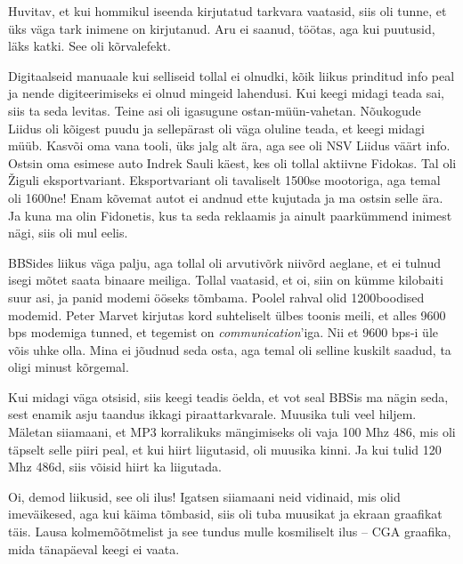 Huvitav, et kui hommikul iseenda kirjutatud 
tarkvara vaatasid, siis oli tunne, et üks väga tark inimene on kirjutanud. Aru ei 
saanud, töötas, aga kui puutusid, läks katki. See oli kõrvalefekt. 


Digitaalseid manuaale kui selliseid tollal ei olnudki, kõik liikus prinditud info peal 
ja nende digiteerimiseks ei olnud mingeid lahendusi. Kui keegi midagi teada sai, siis ta seda levitas. Teine asi oli igasugune 
ostan-müün-vahetan. Nõukogude Liidus oli kõigest puudu ja sellepärast oli väga oluline 
teada, et keegi midagi müüb. Kasvõi oma vana tooli, üks jalg 
alt ära, aga see oli NSV Liidus väärt info. Ostsin oma 
esimese auto Indrek Sauli käest, kes oli tollal 
aktiivne Fidokas. Tal oli Žiguli eksportvariant. Eksportvariant oli tavaliselt 
1500se mootoriga, aga temal oli 1600ne! Enam kõvemat autot ei andnud 
ette kujutada ja ma ostsin selle ära. Ja kuna ma olin Fidonetis, kus ta seda reklaamis 
ja ainult paarkümmend inimest nägi, siis oli mul eelis.


BBSides liikus väga palju, aga tollal oli arvutivõrk niivõrd aeglane, et ei
tulnud isegi mõtet saata binaare meiliga. Tollal vaatasid, et 
oi, siin on kümme kilobaiti suur asi, ja panid modemi ööseks tõmbama. 
Poolel rahval olid 1200boodised 
modemid. Peter Marvet kirjutas kord suhteliselt ülbes 
toonis meili, et alles 9600 bps modemiga tunned, et tegemist on 
\emph{communication}'iga. Nii et 9600 bps-i üle võis uhke 
olla. Mina ei jõudnud seda osta, aga temal oli selline kuskilt 
saadud, ta oligi minust kõrgemal. 

Kui midagi väga otsisid, siis keegi teadis öelda, et 
vot seal BBSis ma nägin seda, sest enamik asju taandus ikkagi 
piraattarkvarale. Muusika tuli veel hiljem. Mäletan siiamaani, 
et MP3 korralikuks mängimiseks oli vaja 100 Mhz 486, mis oli täpselt selle 
piiri peal, et kui hiirt liigutasid, oli muusika kinni. Ja kui tulid 120 Mhz 
486d, siis võisid hiirt ka liigutada.


Oi, demod liikusid, see oli ilus! Igatsen siiamaani neid vidinaid, mis olid 
imeväikesed, aga kui käima tõmbasid, siis oli tuba muusikat ja ekraan 
graafikat täis. Lausa kolmemõõtmelist ja see tundus mulle 
kosmiliselt ilus -- CGA graafika, mida 
tänapäeval keegi ei vaata. 

